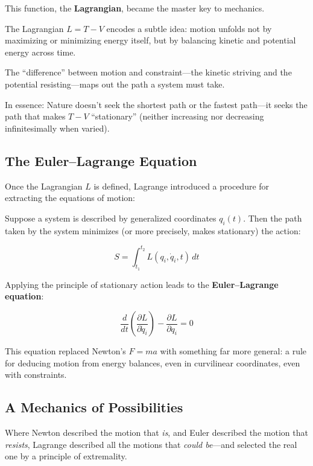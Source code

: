 This function, the \textbf{Lagrangian}, became the master key to mechanics.

\begin{tcolorbox}[colback=gray!5!white, colframe=black, title=\textbf{Historical Sidebar: Why Subtract \( V \) from \( T \)?}, fonttitle=\bfseries, arc=1.5mm, boxrule=0.4pt]

The Lagrangian \( L = T - V \) encodes a subtle idea: motion unfolds not by maximizing or minimizing energy itself, but by balancing kinetic and potential energy across time.

The “difference” between motion and constraint—the kinetic striving and the potential resisting—maps out the path a system must take.

In essence: Nature doesn’t seek the shortest path or the fastest path—it seeks the path that makes \( T - V \) “stationary” (neither increasing nor decreasing infinitesimally when varied).
\end{tcolorbox}

\subsection{The Euler–Lagrange Equation}

Once the Lagrangian \( L \) is defined, Lagrange introduced a procedure for extracting the equations of motion:

Suppose a system is described by generalized coordinates \( q_i(t) \). Then the path taken by the system minimizes (or more precisely, makes stationary) the action:

\[
S = \int_{t_1}^{t_2} L(q_i, \dot{q}_i, t) \, dt
\]

Applying the principle of stationary action leads to the \textbf{Euler–Lagrange equation}:

\[
\frac{d}{dt} \left( \frac{\partial L}{\partial \dot{q}_i} \right) - \frac{\partial L}{\partial q_i} = 0
\]

This equation replaced Newton’s \( F = ma \) with something far more general: a rule for deducing motion from energy balances, even in curvilinear coordinates, even with constraints.

\subsection{A Mechanics of Possibilities}

Where Newton described the motion that \textit{is}, and Euler described the motion that \textit{resists}, Lagrange described all the motions that \textit{could be}—and selected the real one by a principle of extremality.

